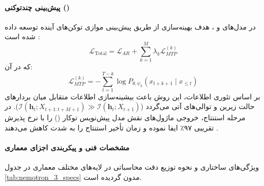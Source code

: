 \paragraph*{پیش‌بینی چندتوکنی ()}
در مدل‌های  و ، هدف بهینه‌سازی از طریق پیش‌بینی موازی توکن‌های آینده توسعه داده شده است \cite{gloeckle2024better}:
\begin{equation}
    \mathcal{L}_{\text{Total}} = \mathcal{L}_{AR} + \sum_{k=1}^{M} \lambda_k \mathcal{L}_{MTP}^{(k)}
\end{equation}
که در آن:
\begin{equation}
    \mathcal{L}_{MTP}^{(k)} = - \sum_{t=1}^{T-k} \log P_{\theta, \psi_k}(x_{t+k+1} \mid x_{\le t})
\end{equation}
بر اساس تئوری اطلاعات، این روش باعث بیشینه‌سازی اطلاعات متقابل میان بردارهای حالت زیرین و توالی‌های آتی می‌گردد ($\mathcal{I}(\mathbf{h}_t; X_{t+1:t+M+1}) \gg \mathcal{I}(\mathbf{h}_t; X_{t+1})$). در مرحله استنتاج، خروجی ماژول‌های  نقش مدل پیش‌نویس توکار () را با نرخ پذیرش تقریبی ۹۷٪ ایفا نموده و زمان تأخیر استنتاج را به شدت کاهش می‌دهند \cite{leviathan2023fast}.

\paragraph*{مشخصات فنی و پیکربندی اجزای معماری}
ویژگی‌های ساختاری و نحوه توزیع دقت محاسباتی در لایه‌های مختلف معماری  در جدول \ref{tab:nemotron_3_specs} مدون گردیده است.

